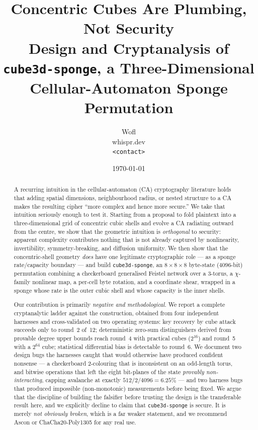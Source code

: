 \documentclass[11pt,a4paper]{article}
\title{\textbf{Concentric Cubes Are Plumbing, Not Security}\\[0.4em]
\large Design and Cryptanalysis of \texttt{cube3d-sponge}, a Three-Dimensional\\
Cellular-Automaton Sponge Permutation}
\author{Wofl \\ \small whispr.dev \\ \small \texttt{<contact>}}
\date{\today}
\theoremstyle{plain}
\theoremstyle{definition}
\theoremstyle{remark}
\begin{document}
\maketitle

\begin{abstract}
A recurring intuition in the cellular-automaton (CA) cryptography literature holds
that adding spatial dimensions, neighbourhood radius, or nested structure to a CA
makes the resulting cipher ``more complex and hence more secure.'' We take that
intuition seriously enough to test it. Starting from a proposal to fold plaintext
into a three-dimensional grid of concentric cubic shells and evolve a CA radiating
outward from the centre, we show that the geometric intuition is \emph{orthogonal}
to security: apparent complexity contributes nothing that is not already captured by
nonlinearity, invertibility, symmetry-breaking, and diffusion uniformity. We then
show that the concentric-shell geometry \emph{does} have one legitimate cryptographic
role --- as a sponge rate/capacity boundary --- and build \texttt{cube3d-sponge}, an
$8\times8\times8$ byte-state ($4096$-bit) permutation combining a checkerboard
generalised Feistel network over a 3-torus, a $\chi$-family nonlinear map, a per-cell
byte rotation, and a coordinate shear, wrapped in a sponge whose rate is the outer
cubic shell and whose capacity is the inner shells.

Our contribution is primarily \emph{negative and methodological}. We report a
complete cryptanalytic ladder against the construction, obtained from four
independent harnesses and cross-validated on two operating systems: key recovery by
cube attack succeeds only to round~2 of~12; deterministic zero-sum distinguishers
derived from provable degree upper bounds reach round~4 with practical cubes
($2^{16}$) and round~5 with a $2^{64}$ cube; statistical differential bias is
detectable to round~6. We document two design bugs the harnesses caught that would
otherwise have produced confident nonsense --- a checkerboard 2-colouring that is
inconsistent on an odd-length torus, and bitwise operations that left the eight
bit-planes of the state \emph{provably non-interacting}, capping avalanche at exactly
$512/2/4096 = 6.25\%$ --- and two harness bugs that produced impossible
(non-monotonic) measurements before being fixed. We argue that the discipline of
building the falsifier before trusting the design is the transferable result here,
and we explicitly decline to claim that \texttt{cube3d-sponge} is secure. It is
merely \emph{not obviously broken}, which is a far weaker statement, and we recommend
Ascon or ChaCha20-Poly1305 for any real use.
\end{abstract}
\end{document}
